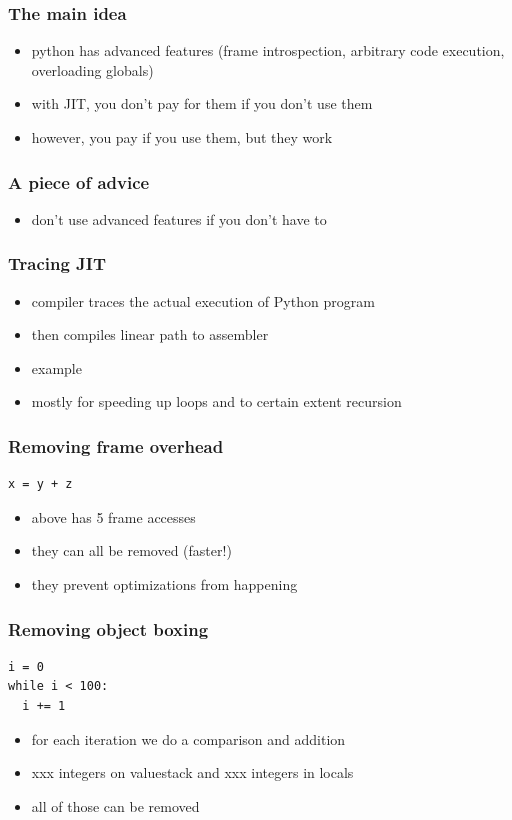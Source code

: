 \documentclass[utf8x, 14pt]{beamer}
\begin{document}
\begin{frame}
  \frametitle{The main idea}
  \begin{itemize}
    \item python has advanced features (frame introspection,
      arbitrary code execution, overloading globals)
    \item with JIT, you don't pay for them if you don't use
      them
    \item however, you pay if you use them, but they work
  \end{itemize}
\end{frame}

\begin{frame}
  \frametitle{A piece of advice}
  \begin{itemize}
    \item don't use advanced features if you don't have to
  \end{itemize}
\end{frame}

\begin{frame}
  \frametitle{Tracing JIT}
  \begin{itemize}
    \item compiler traces the actual execution of Python program
    \item then compiles linear path to assembler
    \item example
    \item mostly for speeding up loops and to certain extent
      recursion
  \end{itemize}
\end{frame}

\begin{frame}[fragile]
  \frametitle{Removing frame overhead}
  \begin{verbatim}
x = y + z
  \end{verbatim}
  \begin{itemize}
    \item above has 5 frame accesses
    \item they can all be removed (faster!)
      \pause
    \item they prevent optimizations from happening
  \end{itemize}
\end{frame}

\begin{frame}[fragile]
  \frametitle{Removing object boxing}
  \begin{verbatim}
i = 0
while i < 100:
  i += 1
  \end{verbatim}
  \begin{itemize}
    \item for each iteration we do a comparison and addition
    \item xxx integers on valuestack and xxx integers in locals
    \item all of those can be removed
  \end{itemize}
\end{frame}
\end{document}
